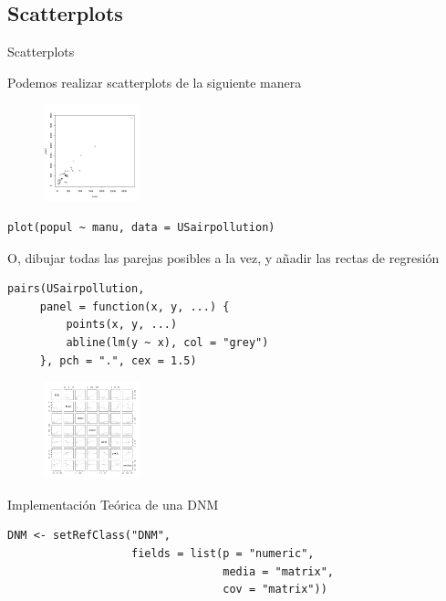 \documentclass[xcolor=table]{beamer}
\begin{document}
\subsection{Scatterplots}
\begin{frame}[fragile]{Scatterplots}

Podemos realizar scatterplots de la siguiente manera

\begin{figure}
\centering
\includegraphics[width=0.25\textwidth]{scatter.png}
\end{figure}
\begin{lstlisting}
plot(popul ~ manu, data = USairpollution)
\end{lstlisting}



\end{frame}
\begin{frame}[fragile]
O, dibujar todas las parejas posibles a la vez, y añadir las rectas de regresión

\begin{lstlisting}
pairs(USairpollution,
     panel = function(x, y, ...) {
         points(x, y, ...)
         abline(lm(y ~ x), col = "grey")
     }, pch = ".", cex = 1.5)
\end{lstlisting}

\begin{figure}
\centering
\includegraphics[width=0.25\textwidth]{reg.png}
\end{figure}

\end{frame}

\begin{frame}[fragile]{Implementación Teórica de una DNM}

\begin{lstlisting}
DNM <- setRefClass("DNM", 
                   fields = list(p = "numeric", 
                                 media = "matrix", 
                                 cov = "matrix"))
\end{lstlisting}
\end{frame}
\end{document}

